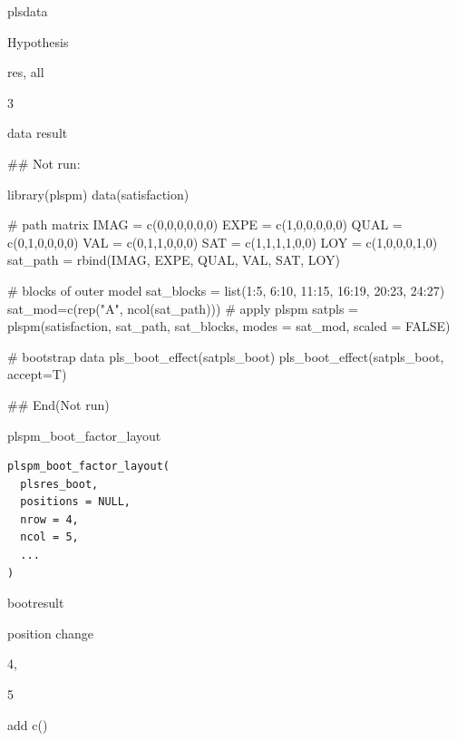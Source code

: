 \documentclass[a4paper]{book}
\begin{document}
%
\begin{Arguments}
\begin{ldescription}
\item[\code{plsres}] plsdata

\item[\code{accept}] Hypothesis

\item[\code{type}] res, all

\item[\code{digits}] 3
\end{ldescription}
\end{Arguments}
%
\begin{Value}
data result
\end{Value}
%
\begin{Examples}
\begin{ExampleCode}

\#\# Not run: 

library(plspm)
data(satisfaction)

# path matrix
IMAG = c(0,0,0,0,0,0)
EXPE = c(1,0,0,0,0,0)
QUAL = c(0,1,0,0,0,0)
VAL = c(0,1,1,0,0,0)
SAT = c(1,1,1,1,0,0)
LOY = c(1,0,0,0,1,0)
sat_path = rbind(IMAG, EXPE, QUAL, VAL, SAT, LOY)

# blocks of outer model
sat_blocks = list(1:5, 6:10, 11:15, 16:19, 20:23, 24:27)
sat_mod=c(rep("A", ncol(sat_path)))
# apply plspm
satpls = plspm(satisfaction, sat_path, sat_blocks, modes = sat_mod,
               scaled = FALSE)



  # bootstrap data
pls_boot_effect(satpls_boot)
pls_boot_effect(satpls_boot, accept=T)


## End(Not run)

\end{ExampleCode}
\end{Examples}
%
\begin{Description}
plspm\_boot\_factor\_layout
\end{Description}
%
\begin{Usage}
\begin{verbatim}
plspm_boot_factor_layout(
  plsres_boot,
  positions = NULL,
  nrow = 4,
  ncol = 5,
  ...
)
\end{verbatim}
\end{Usage}
%
\begin{Arguments}
\begin{ldescription}
\item[\code{plsres\_boot}] bootresult

\item[\code{positions}] position change

\item[\code{nrow}] 4,

\item[\code{ncol}] 5

\item[\code{...}] add c()
\end{ldescription}
\end{Arguments}
\end{document}
